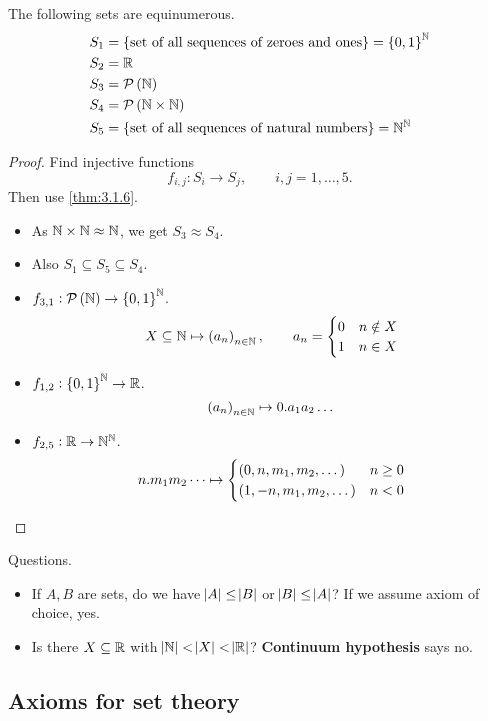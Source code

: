 \begin{example}
The following sets are equinumerous.
\begin{align*}
S_1 & = \cbr{\text{set of all sequences of zeroes and ones}} = \cbr{0, 1}^\N \\
S_2 & = \R \\
S_3 & = \PP\br{\N} \\
S_4 & = \PP\br{\N \times \N} \\
S_5 & = \cbr{\text{set of all sequences of natural numbers}} = \N^\N
\end{align*}
\end{example}

\begin{proof}
Find injective functions
$$ f_{i, j} : S_i \to S_j, \qquad i, j = 1, \dots, 5. $$
Then use \ref{thm:3.1.6}.
\begin{itemize}
\item As $ \mathbb{N} \times \mathbb{N} \approx \mathbb{N} $, we get $ S_3 \approx S_4 $.
\item Also $ S_1 \subseteq S_5 \subseteq S_4 $.
\item $ f_{3, 1} : \PP\br{\N} \to \cbr{0, 1}^\N $.
$$ X \subseteq \N \mapsto \br{a_n}_{n \in \N}, \qquad a_n =
\begin{cases}
0 & n \notin X \\
1 & n \in X
\end{cases}
$$
\item $ f_{1, 2} : \cbr{0, 1}^\N \to \R $.
$$ \br{a_n}_{n \in \N} \mapsto 0 . a_1a_2 \dots $$
\item $ f_{2, 5} : \mathbb{R} \to \mathbb{N}^{\mathbb{N}} $.
$$ n . m_1m_2 \dots \mapsto
\begin{cases}
\br{0, n, m_1, m_2, \dots} & n \ge 0 \\
\br{1, -n, m_1, m_2, \dots} & n < 0
\end{cases}
$$
\end{itemize}
\end{proof}

Questions.
\begin{itemize}
\item If $ A, B $ are sets, do we have $ \abs{A} \le \abs{B} $ or $ \abs{B} \le \abs{A} $? If we assume axiom of choice, yes.
\item Is there $ X \subseteq \mathbb{R} $ with $ \abs{\mathbb{N}} < \abs{X} < \abs{\mathbb{R}} $? \textbf{Continuum hypothesis} says no.
\end{itemize}

\pagebreak

\subsection{Axioms for set theory}

